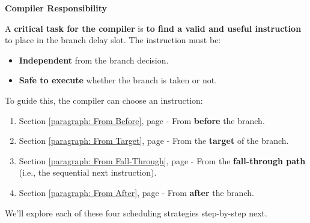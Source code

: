 \highspace
\begin{flushleft}
    \textcolor{Red2}{ \textbf{Compiler Responsibility}}
\end{flushleft}
A \textbf{critical task for the compiler} is \textbf{to find a valid and useful instruction} to place in the branch delay slot. The instruction must be:
\begin{itemize}
    \item \textbf{Independent} from the branch decision.
    \item \textbf{Safe to execute} whether the branch is taken or not.
\end{itemize}
To guide this, the compiler can choose an instruction:
\begin{enumerate}
    \item Section \ref{paragraph: From Before}, page \pageref{paragraph: From Before} - From \textbf{before} the branch.
    \item Section \ref{paragraph: From Target}, page \pageref{paragraph: From Target} - From the \textbf{target} of the branch.
    \item Section \ref{paragraph: From Fall-Through}, page \pageref{paragraph: From Fall-Through} - From the \textbf{fall-through path} (i.e., the sequential next instruction).
    \item Section \ref{paragraph: From After}, page \pageref{paragraph: From After} - From \textbf{after} the branch.
\end{enumerate}
We'll explore each of these four scheduling strategies step-by-step next.


